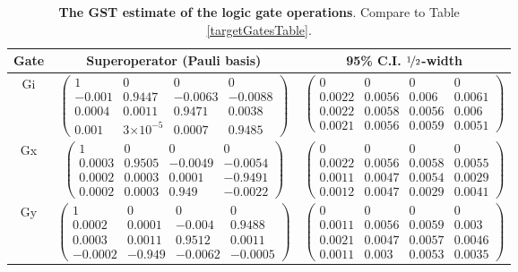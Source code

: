 \documentclass{article}[11pt]
\providecommand{\e}[1]{\ensuremath{\times 10^{#1}}}
\begin{document}
\begin{table}[h]
\begin{center}
\begin{tabular}[l]{|c|c|c|}
\hline
Gate & Superoperator (Pauli basis) & 95\% C.I. $\nicefrac{1}{2}$-width \\ \hline
Gi & $ \left(\!\!\begin{array}{cccc}
1 & 0 & 0 & 0 \\ 
-0.001 & 0.9447 & -0.0063 & -0.0088 \\ 
0.0004 & 0.0011 & 0.9471 & 0.0038 \\ 
0.001 & 3\e{-5} & 0.0007 & 0.9485
 \end{array}\!\!\right) $
 & $ \left(\!\!\begin{array}{cccc}
0 & 0 & 0 & 0 \\ 
0.0022 & 0.0056 & 0.006 & 0.0061 \\ 
0.0022 & 0.0058 & 0.0056 & 0.006 \\ 
0.0021 & 0.0056 & 0.0059 & 0.0051
 \end{array}\!\!\right) $
 \\ \hline
Gx & $ \left(\!\!\begin{array}{cccc}
1 & 0 & 0 & 0 \\ 
0.0003 & 0.9505 & -0.0049 & -0.0054 \\ 
0.0002 & 0.0003 & 0.0001 & -0.9491 \\ 
0.0002 & 0.0003 & 0.949 & -0.0022
 \end{array}\!\!\right) $
 & $ \left(\!\!\begin{array}{cccc}
0 & 0 & 0 & 0 \\ 
0.0022 & 0.0056 & 0.0058 & 0.0055 \\ 
0.0011 & 0.0047 & 0.0054 & 0.0029 \\ 
0.0012 & 0.0047 & 0.0029 & 0.0041
 \end{array}\!\!\right) $
 \\ \hline
Gy & $ \left(\!\!\begin{array}{cccc}
1 & 0 & 0 & 0 \\ 
0.0002 & 0.0001 & -0.004 & 0.9488 \\ 
0.0003 & 0.0011 & 0.9512 & 0.0011 \\ 
-0.0002 & -0.949 & -0.0062 & -0.0005
 \end{array}\!\!\right) $
 & $ \left(\!\!\begin{array}{cccc}
0 & 0 & 0 & 0 \\ 
0.0011 & 0.0056 & 0.0059 & 0.003 \\ 
0.0021 & 0.0047 & 0.0057 & 0.0046 \\ 
0.0011 & 0.003 & 0.0053 & 0.0035
 \end{array}\!\!\right) $
 \\ \hline
\end{tabular}

\caption{\textbf{The GST estimate of the logic gate operations}.  Compare to Table \ref{targetGatesTable}.\label{bestGatesetGatesTable}}
\end{center}
\end{table}
\end{document}
